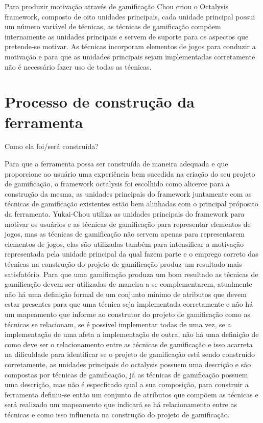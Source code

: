 Para produzir motivação através de gamificação Chou criou o Octalysis framework, composto de oito unidades principais, cada unidade principal possui um número variável de técnicas, as técnicas de gamificação compõem internamente as unidades principais e servem de suporte para os aspectos que pretende-se motivar. As técnicas incorporam elementos de jogos para conduzir a motivação e para que as unidades principais sejam implementadas corretamente não é necessário fazer uso de todas as técnicas.

\section{Processo de construção da ferramenta}

Como ela foi/será construída?

Para que a ferramenta possa ser construída de maneira adequada e que proporcione ao usuário uma experiência bem sucedida na criação do seu projeto de gamificação, o framework octalysis foi escolhido como alicerce para a construção da mesma, as unidades principais do framework juntamente com as técnicas de gamificação existentes estão bem alinhadas com o principal próposito da ferramenta. Yukai-Chou utiliza as unidades principais do framework para motivar os usuários e as técnicas de gamificação para representar elementos de jogos, mas as técnicas de gamificação não servem apenas para representarem elementos de jogos, elas são utilizadas também para intensificar a motivação representada pela unidade principal da qual fazem parte e o emprego correto das técnicas na construção do projeto de gamificação produz um resultado mais satisfatório. Para que uma gamificação produza um bom resultado as técnicas de gamificação devem ser utilizadas de maneira a se complementarem, atualmente não há uma definição formal de um conjunto mínimo de atributos que devem estar presentes para que uma técnica seja implementada corretamente e não há um mapeamento que informe ao construtor do projeto de gamificação como as técnicas se relacionam, se é possível implementar todas de uma vez, se a implementação de uma afeta a implementação de outra, não há uma definição de como deve ser o relacionamento entre as técnicas de gamificação e isso acarreta na dificuldade para identificar se o projeto de gamificação está sendo construído corretamente, as unidades principais do octalysis possuem uma descrição e são compostas por técnicas de gamificação, já as técnicas de gamificação possuem uma descrição, mas não é especficado qual a sua composição, para construir a ferramenta definiu-se então um conjunto de atributos que compõem as técnicas e será realizado um mapeamento que indicará se há relacionamento entre as técnicas e como isso influencia na construção do projeto de gamificação.  


